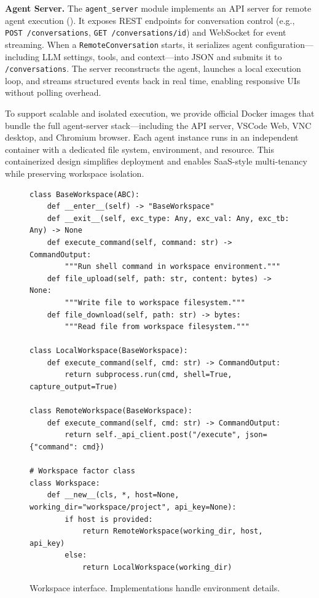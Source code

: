 \textbf{Agent Server.}
The \texttt{agent\_server} module implements an API server for remote agent execution (). It exposes REST endpoints for conversation control (e.g., \texttt{POST /conversations}, \texttt{GET /conversations/{id}}) and WebSocket for event streaming. When a \texttt{RemoteConversation} starts, it serializes agent configuration—including LLM settings, tools, and context—into JSON and submits it to \texttt{/conversations}. The server reconstructs the agent, launches a local execution loop, and streams structured events back in real time, enabling responsive UIs without polling overhead.



To support scalable and isolated execution, we provide official Docker images that bundle the full agent-server stack—including the API server, VSCode Web, VNC desktop, and Chromium browser. Each agent instance runs in an independent container with a dedicated file system, environment, and resource. This containerized design simplifies deployment and enables SaaS-style multi-tenancy while preserving workspace isolation.

\begin{figure}[!h]
\begin{verbatim}
class BaseWorkspace(ABC):
    def __enter__(self) -> "BaseWorkspace"
    def __exit__(self, exc_type: Any, exc_val: Any, exc_tb: Any) -> None
    def execute_command(self, command: str) -> CommandOutput:
        """Run shell command in workspace environment."""
    def file_upload(self, path: str, content: bytes) -> None:
        """Write file to workspace filesystem."""
    def file_download(self, path: str) -> bytes:
        """Read file from workspace filesystem."""

class LocalWorkspace(BaseWorkspace):
    def execute_command(self, cmd: str) -> CommandOutput:
        return subprocess.run(cmd, shell=True, capture_output=True)

class RemoteWorkspace(BaseWorkspace):
    def execute_command(self, cmd: str) -> CommandOutput:
        return self._api_client.post("/execute", json={"command": cmd})

# Workspace factor class
class Workspace:
    def __new__(cls, *, host=None, working_dir="workspace/project", api_key=None):
        if host is provided:
            return RemoteWorkspace(working_dir, host, api_key)
        else:
            return LocalWorkspace(working_dir)
\end{verbatim}
\caption{Workspace interface. Implementations handle environment details.}
\label{fig:workspace-interface}
\end{figure}

